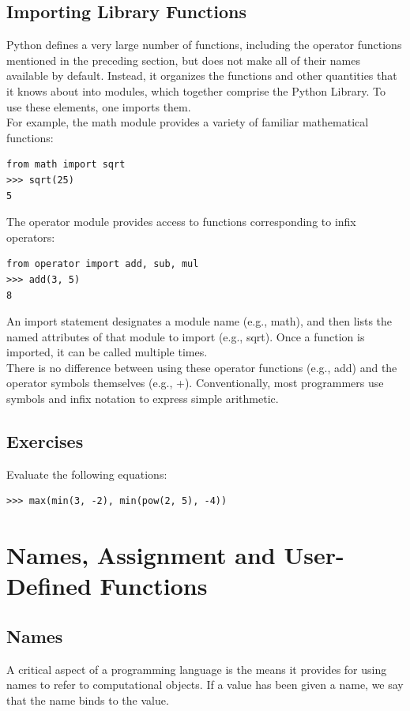 \documentclass[11pt]{article}
\begin{document}
\subsection{Importing Library Functions}
Python defines a very large number of functions, including the operator functions mentioned in the preceding section, but does not make all of their names available by default. Instead, it organizes the functions and other quantities that it knows about into modules, which together comprise the Python Library. To use these elements, one imports them. \\
For example, the math module provides a variety of familiar mathematical functions:
\begin{lstlisting}
from math import sqrt
>>> sqrt(25) 
5
\end{lstlisting}

The operator module provides access to functions corresponding to infix operators: 

\begin{lstlisting} 
from operator import add, sub, mul
>>> add(3, 5)
8
\end{lstlisting}
An import statement designates a module name (e.g., math), and then lists the named attributes of that module to import (e.g., sqrt). Once a function is imported, it can be called multiple times. \\
There is no difference between using these operator functions (e.g., add) and the operator symbols themselves (e.g., +). Conventionally, most programmers use symbols and infix notation to express simple arithmetic.

\subsection{Exercises} 
Evaluate the following equations: 
\begin{lstlisting}
>>> max(min(3, -2), min(pow(2, 5), -4))
\end{lstlisting}

\newpage
\section{Names, Assignment and User-Defined Functions}
\subsection{Names} 
A critical aspect of a programming language is the means it provides for using names to refer to computational objects. If a value has been given a name, we say that the name binds to the value. 
\end{document}
